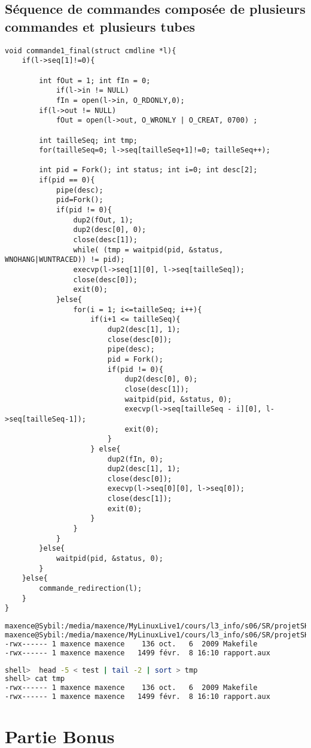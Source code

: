 \documentclass{report}
\begin{document}
		\section{S\'equence de commandes compos\'ee de plusieurs commandes et plusieurs tubes}
			\begin{lstlisting}
void commande1_final(struct cmdline *l){
	if(l->seq[1]!=0){

		int fOut = 1; int fIn = 0;
			if(l->in != NULL)
			fIn = open(l->in, O_RDONLY,0);
		if(l->out != NULL)
			fOut = open(l->out, O_WRONLY | O_CREAT, 0700) ;

		int tailleSeq; int tmp;
		for(tailleSeq=0; l->seq[tailleSeq+1]!=0; tailleSeq++);

		int pid = Fork(); int status; int i=0; int desc[2];
		if(pid == 0){
			pipe(desc);
			pid=Fork();
			if(pid != 0){
				dup2(fOut, 1);
				dup2(desc[0], 0);
				close(desc[1]);
				while( (tmp = waitpid(pid, &status, WNOHANG|WUNTRACED)) != pid);
				execvp(l->seq[1][0], l->seq[tailleSeq]);
				close(desc[0]);
				exit(0);
			}else{
				for(i = 1; i<=tailleSeq; i++){
					if(i+1 <= tailleSeq){
						dup2(desc[1], 1);
						close(desc[0]);
						pipe(desc);
						pid = Fork();
						if(pid != 0){
							dup2(desc[0], 0);
							close(desc[1]);
							waitpid(pid, &status, 0);
							execvp(l->seq[tailleSeq - i][0], l->seq[tailleSeq-1]);
							exit(0);
						}
					} else{
						dup2(fIn, 0);
						dup2(desc[1], 1);
						close(desc[0]);
						execvp(l->seq[0][0], l->seq[0]);
						close(desc[1]);
						exit(0);
					}
				}		
			}
		}else{
			waitpid(pid, &status, 0);
		}
	}else{
		commande_redirection(l);
	}
}
			\end{lstlisting}
			\begin{lstlisting}[frame=single,basicstyle=\footnotesize,language=bash]
maxence@Sybil:/media/maxence/MyLinuxLive1/cours/l3_info/s06/SR/projetSHELL$ head -5 < test | tail -2 | sort > tmp2
maxence@Sybil:/media/maxence/MyLinuxLive1/cours/l3_info/s06/SR/projetSHELL$ cat tmp2
-rwx------ 1 maxence maxence    136 oct.   6  2009 Makefile
-rwx------ 1 maxence maxence   1499 févr.  8 16:10 rapport.aux
			\end{lstlisting}
			\begin{lstlisting}[frame=single,basicstyle=\footnotesize,language=bash]
shell>  head -5 < test | tail -2 | sort > tmp
shell> cat tmp
-rwx------ 1 maxence maxence    136 oct.   6  2009 Makefile
-rwx------ 1 maxence maxence   1499 févr.  8 16:10 rapport.aux
			\end{lstlisting}
	\chapter{Partie Bonus}
\end{document}
